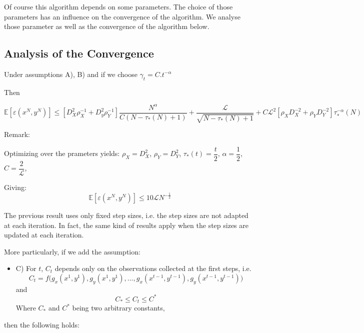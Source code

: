 \documentclass[10pt]{article}
\begin{document}
Of course this algorithm depends on some parameters. The choice of those parameters has an influence on the convergence of the algorithm. We analyse those parameter as well as the convergence of the algorithm below.

\subsection{Analysis of the Convergence}

\begin{thm}

Under assumptions A), B) and if we choose $\gamma_{t} = C.t^{-\alpha}$

Then

$$
\mathbb{E}[\varepsilon(x^{N},y^{N})] \leq [D_{X}^{2}\rho_{X}^{-1} + D_{y}^{2}\rho_{Y}^{-1}]\dfrac{N^{\alpha}}{C(N - \tau_{*}(N) + 1)} +  \dfrac{\mathcal{L}}{\sqrt{N - \tau_{*}(N) + 1}}+ C\mathcal{L}^{2}[\rho_{X}D_{X}^{-2} + \rho_{Y}D_{Y}^{-2}]\tau_{*}^{-\alpha}(N)
$$

\end{thm}


Remark: 

\begin{cor}
Optimizing over the prameters yields:
 $\rho_{X} = D_{X}^{2}$,
$\rho_{Y} = D_{Y}^{2}$,
$\tau_{*}(t) = \dfrac{t}{2}$,
$\alpha = \dfrac{1}{2}$,
$C = \dfrac{2}{\mathcal{L}}$,

Giving:
$$
\boxed{ \mathbb{E}[\varepsilon(x^{N},y^{N})]  \leq 10\mathcal{L} N^{-\frac{1}{2}} }
$$
\end{cor}


The previous result uses only fixed step sizes, i.e. the step sizes are not adapted at each iteration.
In fact, the same kind of results apply when the step sizes are updated at each iteration.

More particularly, if we add the assumption:

\begin{itemize}
\item C) For $t$, $C_{t}$ depends only on the observations collected at the first steps, i.e. 
$$C_{t} = f\big(g_{x}(x^{1},y^{1}),g_{y}(x^{1},y^{1}),...,g_{x}(x^{t-1},y^{t-1}),g_{y}(x^{t-1},y^{t-1})\big)$$
and 
$$
C_{*} \leq C_{t} \leq C^{*}
$$
Where $C_{*}$ and $C^{*}$ being two arbitrary constants,

\end{itemize}

then the following holds:
\end{document}
